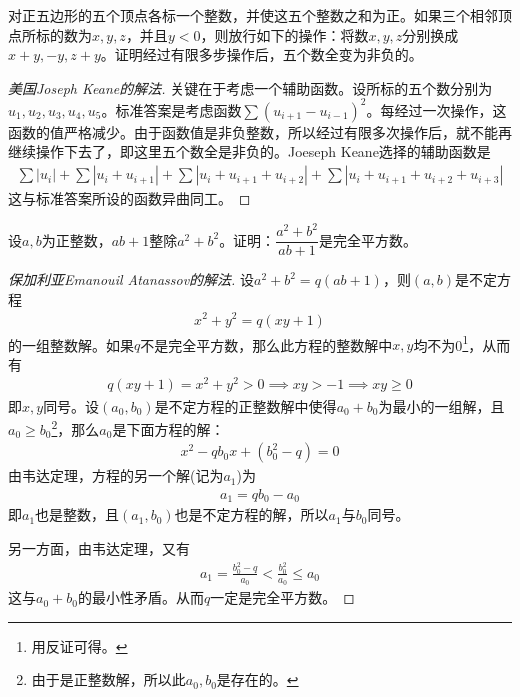 \begin{example}[IMO 1986]
  对正五边形的五个顶点各标一个整数，并使这五个整数之和为正。如果三个相邻顶点所标的数为$x,y,z$，并且$y<0$，则放行如下的操作：将数$x,y,z$分别换成$x+y,-y,z+y$。证明经过有限多步操作后，五个数全变为非负的。
\end{example}
\begin{proof}[美国Joseph Keane的解法]
  关键在于考虑一个辅助函数。设所标的五个数分别为$u_1,u_2,u_3,u_4,u_5$。标准答案是考虑函数$\sum\left(u_{i+1}-u_{i-1}\right)^2$。每经过一次操作，这函数的值严格减少。由于函数值是非负整数，所以经过有限多次操作后，就不能再继续操作下去了，即这里五个数全是非负的。Joeseph Keane选择的辅助函数是
  \begin{align*}
    \sum|u_i| + \sum|u_i + u_{i+1}| + \sum|u_i + u_{i+1} + u_{i+2}| + \sum|u_i + u_{i+1} + u_{i+2} + u_{i+3}|
  \end{align*}
  这与标准答案所设的函数异曲同工。
\end{proof}

\begin{example}[IMO 1988，数论]
  设$a,b$为正整数，$ab+1$整除$a^2+b^2$。证明：$\dfrac{a^2+b^2}{ab+1}$是完全平方数。
\end{example}
\begin{proof}[保加利亚Emanouil Atanassov的解法]
  设$a^2+b^2=q(ab+1)$，则$(a,b)$是不定方程
  \begin{align*}
    x^2+y^2=q(xy+1)
  \end{align*}
  的一组整数解。如果$q$不是完全平方数，那么此方程的整数解中$x,y$均不为0\footnote{用反证可得。}，从而有
  \begin{align*}
    q(xy+1)=x^2+y^2>0\implies xy>-1\implies xy\ge0
  \end{align*}
  即$x,y$同号。设$(a_0,b_0)$是不定方程的正整数解中使得$a_0+b_0$为最小的一组解，且$a_0\ge b_0$\footnote{由于是正整数解，所以此$a_0,b_0$是存在的。}，那么$a_0$是下面方程的解：
  \begin{align*}
    x^2 - qb_0x + (b_0^2-q)=0
  \end{align*}
  由韦达定理，方程的另一个解(记为$a_1$)为
  \begin{align*}
    a_1=qb_0 - a_0
  \end{align*}
  即$a_1$也是整数，且$(a_1,b_0)$也是不定方程的解，所以$a_1$与$b_0$同号。

  另一方面，由韦达定理，又有
  \begin{align*}
    a_1=\frac{b_0^2-q}{a_0}<\frac{b_0^2}{a_0}\le a_0
  \end{align*}
  这与$a_0+b_0$的最小性矛盾。从而$q$一定是完全平方数。
\end{proof}

